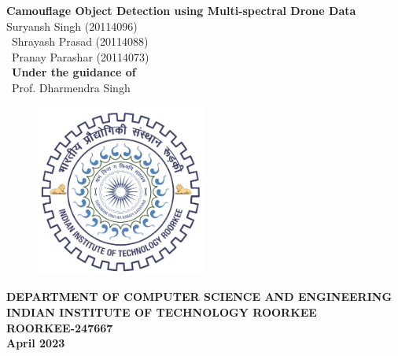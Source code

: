 \documentclass[a4paper,12pt]{article}
\begin{document}
\pagestyle{fancy}
\thispagestyle{empty}
\fancyhead[L]{}
\renewcommand*{\thefootnote}{\fnsymbol{footnote}}
\begin{center}
{\fontsize{24pt}{28pt}\selectfont \textbf{Camouflage Object Detection using Multi-spectral Drone Data}}
\vspace{1.5cm}
{\Large
\\ Suryansh Singh (20114096) \\
\vspace{0.2cm}
\ Shrayash Prasad (20114088) \\
\vspace{0.2cm}
\ Pranay Parashar (20114073) \\
\vspace{0.5cm}
\ \textbf{Under the guidance of} \\
\vspace{0.2cm}
\ Prof. Dharmendra Singh \\
\vspace{1.5cm}
}
\begin{figure}[h]
  \centering
  \includegraphics[width=0.5\textwidth]{sections/LBP/iit-roorkee-logo.png}
  \label{fig:image}
\end{figure}
\vspace{0.5cm}
{\fontsize{12pt}{16pt}\selectfont \textbf{DEPARTMENT OF COMPUTER SCIENCE AND ENGINEERING \\ INDIAN INSTITUTE OF TECHNOLOGY ROORKEE \\ ROORKEE-247667 \\ April 2023}}
\newpage
\medskip
\end{center}
\vspace{0.4cm}
\medskip

























\end{document}
